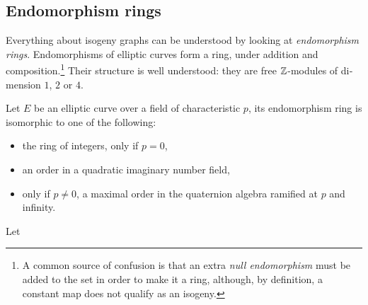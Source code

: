 \begin{otherlanguage}{english}
  
  \section{Endomorphism rings}

  Everything about isogeny graphs can be understood by looking at
  \emph{endomorphism rings}. Endomorphisms of elliptic curves form a
  ring, under addition and composition.\footnote{A common source of
    confusion is that an extra \emph{null endomorphism} must be added
    to the set in order to make it a ring, although, by definition, a
    constant map does not qualify as an isogeny.} Their structure is
  well understood: they are free $\mathbb{Z}$-modules of dimension $1$, $2$ or
  $4$.

  \begin{theorem}
    Let $E$ be an elliptic curve over a field of characteristic $p$,
    its endomorphism ring is isomorphic to one of the following:
    \begin{itemize}
    \item the ring of integers, only if $p=0$,
    \item an order in a quadratic imaginary number field,
    \item only if $p\ne 0$, a maximal order in the quaternion algebra
      ramified at $p$ and infinity.
    \end{itemize}
  \end{theorem}
  
  \begin{theorem}
    Let 
  \end{theorem}



  

  
\end{otherlanguage}




\EndContrib



